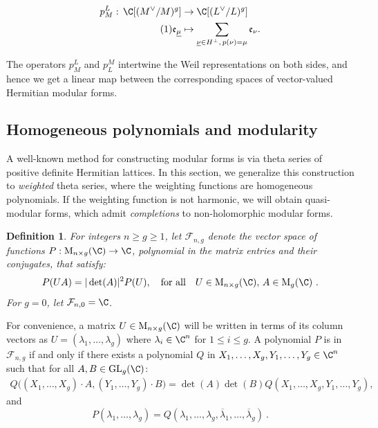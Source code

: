 \documentclass[11pt,letterpaper,english]{amsart}
\numberwithin{equation}{subsection}
\numberwithin{equation}{section}
\newcommand\numberthis{\addtocounter{equation}{1}\tag{\theequation}}
\newcommand\cF{{\mathcal F}}
\theoremstyle{plain}
\newtheorem{definition}[theorem]{Definition}
\theoremstyle{remark}
\begin{document}
\begin{align*}
 p_{M}^{L}:\, \C[(M^{\vee}/M)^g]&\rightarrow \C[(L^{\vee}/L)^g]\\\numberthis\label{push}
			\mathfrak{e}_{\underline \mu}&\mapsto \sum_{\underline\nu\in H^{\bot},\,p(\nu)=\mu}\mathfrak{e}_{\nu}.		 
\end{align*}

The operators $p_{M}^{L}$ and $p_{L}^M$ intertwine the Weil representations on both sides, and hence we get a linear map between the corresponding spaces of vector-valued Hermitian modular forms. 

\subsection{Homogeneous polynomials and modularity}\label{homog}

A well-known method for constructing modular forms is via theta series of positive definite Hermitian lattices. In this section, we generalize this construction to {\it weighted} theta series, where the weighting functions are homogeneous polynomials. If the weighting function is not harmonic, we will obtain quasi-modular forms, which admit {\it completions} to non-holomorphic modular forms.
\medskip

\begin{definition}
    For integers $n\geq g\geq 1$, let $\cF_{n,g}$ denote the vector space of functions $P:\mathrm M_{n\times g}(\C)\rightarrow \C$, polynomial in the matrix entries and their conjugates, that satisfy: 
\[P(UA)=|\det(A)|^2P(U),\quad  \textrm{for all}\quad  U\in\mathrm{M}_{n\times g}(\C),\, A\in\mathrm{M}_g(\C)~.\]
For $g=0$, let $\cF_{n,0}=\C$.
\end{definition}

For convenience, a matrix $U\in\mathrm{M}_{n\times g}(\C)$ will be written in terms of its column vectors as $U=(\lambda_1,\ldots,\lambda_g)$ where $\lambda_i\in\C^n$ for $1\leq i\leq g$. A polynomial $P$ is in $\cF_{n,g}$ if and only if there exists a polynomial $Q$ in $X_1,\ldots,X_g,Y_1,\ldots,Y_g\in\C^n$ such that for all $A,B\in\mathrm{GL}_g(\C)$:
\begin{align}\label{eq:bi-invariance}
    Q\big((X_1,\ldots,X_g)\cdot A,(Y_1,\ldots,Y_g)\cdot B\big)=\det(A)\det(B)Q(X_1,\ldots,X_g,Y_1,\ldots,Y_g),\end{align}
and 
\[P(\lambda_1,\ldots,\lambda_g)=Q(\lambda_1,\ldots,\lambda_g,\overline{\lambda}_1,\ldots,\overline{\lambda}_g)~.\]
\end{document}

